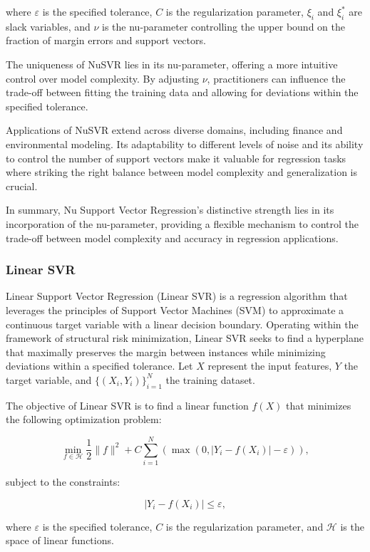 \documentclass[twocolumn]{article}
\begin{document}
where \(\varepsilon\) is the specified tolerance, \(C\) is the regularization parameter, \(\xi_i\) and \(\xi_i^*\) are slack variables, and \(\nu\) is the nu-parameter controlling the upper bound on the fraction of margin errors and support vectors.

The uniqueness of NuSVR lies in its nu-parameter, offering a more intuitive control over model complexity. By adjusting \(\nu\), practitioners can influence the trade-off between fitting the training data and allowing for deviations within the specified tolerance.

Applications of NuSVR extend across diverse domains, including finance and environmental modeling. Its adaptability to different levels of noise and its ability to control the number of support vectors make it valuable for regression tasks where striking the right balance between model complexity and generalization is crucial.

In summary, Nu Support Vector Regression's distinctive strength lies in its incorporation of the nu-parameter, providing a flexible mechanism to control the trade-off between model complexity and accuracy in regression applications.

		\subsubsection{Linear SVR}
Linear Support Vector Regression (Linear SVR) is a regression algorithm that leverages the principles of Support Vector Machines (SVM) to approximate a continuous target variable with a linear decision boundary. Operating within the framework of structural risk minimization, Linear SVR seeks to find a hyperplane that maximally preserves the margin between instances while minimizing deviations within a specified tolerance. Let \(X\) represent the input features, \(Y\) the target variable, and \(\{(X_i, Y_i)\}_{i=1}^{N}\) the training dataset.

The objective of Linear SVR is to find a linear function \(f(X)\) that minimizes the following optimization problem:

\[ \min_{f \in \mathcal{H}} \frac{1}{2} \|f\|^2 + C \sum_{i=1}^{N} \left(\max(0, |Y_i - f(X_i)| - \varepsilon)\right), \]

subject to the constraints:

\[ |Y_i - f(X_i)| \leq \varepsilon, \]

where \(\varepsilon\) is the specified tolerance, \(C\) is the regularization parameter, and \(\mathcal{H}\) is the space of linear functions.
\end{document}
